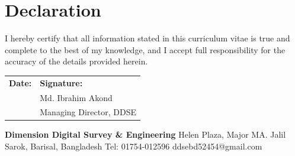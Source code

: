 \documentclass[11pt, a4paper]{article}
\begin{document}
\vspace{4pt}

\section{Declaration}

I hereby certify that all information stated in this curriculum vitae is true and complete
to the best of my knowledge, and I accept full responsibility for the accuracy of the
details provided herein.

\vspace{20pt}

\noindent
\begin{tabularx}{\linewidth}{@{} X X @{}}
  \textbf{Date:} \underline{\hspace{4cm}} &
  \textbf{Signature:} \underline{\hspace{4.5cm}} \\[4pt]
  & \small\color{ddseMid}Md. Ibrahim Akond \\
  & \small\color{ddseMid}Managing Director, DDSE \\
\end{tabularx}

\vfill
\noindent{\color{ddseBorder}\rule{\linewidth}{0.5pt}}
\vspace{3pt}
\noindent
{\footnotesize\color{ddseMid}
  \textbf{Dimension Digital Survey \& Engineering} \quad
  Helen Plaza, Major MA. Jalil Sarok, Barisal, Bangladesh \quad
  \textbullet\quad Tel: 01754-012596 \quad
  \textbullet\quad ddsebd52454@gmail.com
}
\end{document}
